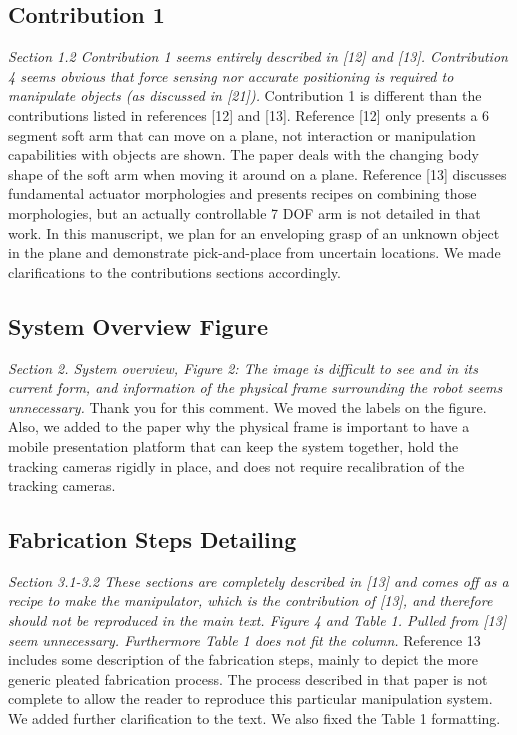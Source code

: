 \documentclass[letterpaper, 10 pt, twocolumn, conference]{article}
\begin{document}
\subsection{Contribution 1}
\textit{Section 1.2 Contribution 1 seems entirely described in [12] and [13]. Contribution 4 seems obvious that force sensing nor accurate positioning is required to manipulate objects (as discussed in [21]).}
%
Contribution 1 is different than the contributions listed in references [12] and [13]. Reference [12] only presents a 6 segment soft arm that can move on a plane, not interaction or manipulation capabilities with objects are shown. The paper deals with the changing body shape of the soft arm when moving it around on a plane. Reference [13] discusses fundamental actuator morphologies and presents recipes on combining those morphologies, but an actually controllable 7 DOF arm is not detailed in that work. In this manuscript, we plan for an enveloping grasp of an unknown object in the plane and demonstrate pick-and-place from uncertain locations. We made clarifications to the contributions sections accordingly.
%
\subsection{System Overview Figure}
\textit{Section 2. System overview, Figure 2: The image is difficult to see and in its current form, and information of the physical frame surrounding the robot seems unnecessary.}
%
Thank you for this comment. We moved the labels on the figure. Also, we added to the paper why the physical frame is important to have a mobile presentation platform that can keep the system together, hold the tracking cameras rigidly in place, and does not require recalibration of the tracking cameras. 
%
\subsection{Fabrication Steps Detailing}
\textit{Section 3.1-3.2 These sections are completely described in [13] and comes off as a recipe to make the manipulator, which is the contribution of [13], and therefore should not be reproduced in the main text. Figure 4 and Table 1. Pulled from [13] seem unnecessary. Furthermore Table 1 does not fit the column.}
%
Reference 13 includes some description of the fabrication steps, mainly to depict the more generic pleated fabrication process.  The process described in that paper is not complete to allow the reader to reproduce this particular manipulation system. We added further clarification to the text. We also fixed the Table 1 formatting.
%
\end{document}
